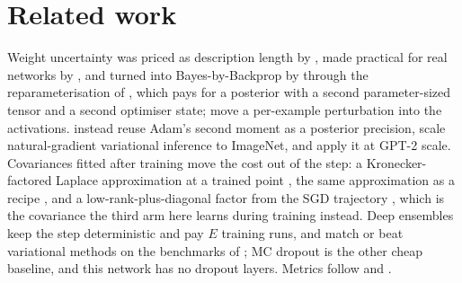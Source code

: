 \section{Related work}
\label{sec:related}

%

Weight uncertainty was priced as description length by \citet{hinton1993mdl}, made
practical for real networks by \citet{graves2011practical}, and turned into
Bayes-by-Backprop by \citet{blundell2015weight} through the reparameterisation of
\citet{kingma2014autoencoding}, which pays for a posterior with a second
parameter-sized tensor and a second optimiser state; \citet{wen2018flipout} move a
per-example perturbation into the activations. \citet{khan2018vadam} instead reuse
Adam's second moment as a posterior precision, \citet{osawa2019practical} scale
natural-gradient variational inference to ImageNet, and \citet{shen2024ivon} apply it
at GPT-2 scale. Covariances fitted after training move the cost out of the step: a
Kronecker-factored Laplace approximation at a trained point
\citep{ritter2018scalable}, the same approximation as a recipe
\citep{daxberger2021laplace}, and a low-rank-plus-diagonal factor from the SGD
trajectory \citep{maddox2019swag}, which is the covariance the third arm here learns
during training instead. Deep ensembles \citep{lakshminarayanan2017simple} keep the
step deterministic and pay $E$ training runs, and match or beat variational methods on
the benchmarks of \citet{ovadia2019trust}; MC dropout \citep{gal2016dropout} is the
other cheap baseline, and this network has no dropout layers. Metrics follow
\citet{guo2017calibration} and \citet{kendall2017uncertainties}.
